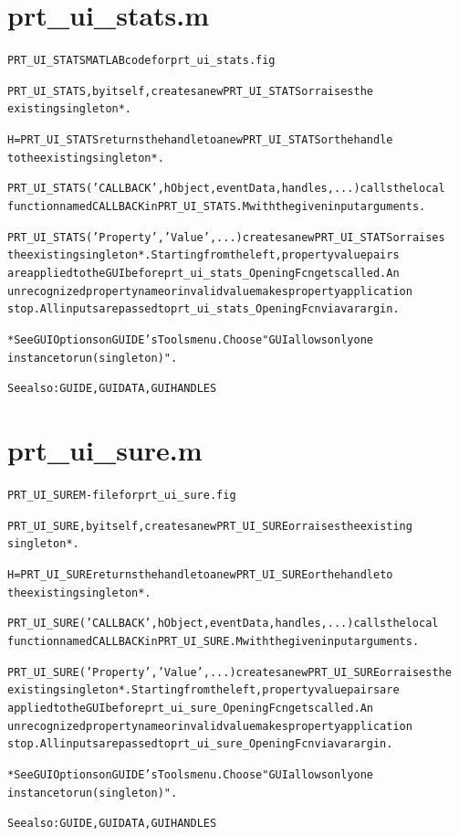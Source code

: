 \section{prt\_ui\_stats.m}
\begin{alltt}

 PRT\_UI\_STATS MATLAB code for prt\_ui\_stats.fig
 
 PRT\_UI\_STATS, by itself, creates a new PRT\_UI\_STATS or raises the
 existing singleton*.
 
 H = PRT\_UI\_STATS returns the handle to a new PRT\_UI\_STATS or the handle
 to the existing singleton*.
 
 PRT\_UI\_STATS('CALLBACK',hObject,eventData,handles,...) calls the local
 function named CALLBACK in PRT\_UI\_STATS.M with the given input arguments.
 
 PRT\_UI\_STATS('Property','Value',...) creates a new PRT\_UI\_STATS or raises
 the existing singleton*.  Starting from the left, property value pairs
 are applied to the GUI before prt\_ui\_stats\_OpeningFcn gets called.  An
 unrecognized property name or invalid value makes property application
 stop.  All inputs are passed to prt\_ui\_stats\_OpeningFcn via varargin.
 
 *See GUI Options on GUIDE's Tools menu.  Choose "GUI allows only one
 instance to run (singleton)".
 
 See also: GUIDE, GUIDATA, GUIHANDLES
\end{alltt}


\section{prt\_ui\_sure.m}
\begin{alltt}

 PRT\_UI\_SURE M-file for prt\_ui\_sure.fig
 
 PRT\_UI\_SURE, by itself, creates a new PRT\_UI\_SURE or raises the existing
 singleton*.
 
 H = PRT\_UI\_SURE returns the handle to a new PRT\_UI\_SURE or the handle to
 the existing singleton*.
 
 PRT\_UI\_SURE('CALLBACK',hObject,eventData,handles,...) calls the local
 function named CALLBACK in PRT\_UI\_SURE.M with the given input arguments.
 
 PRT\_UI\_SURE('Property','Value',...) creates a new PRT\_UI\_SURE or raises the
 existing singleton*.  Starting from the left, property value pairs are
 applied to the GUI before prt\_ui\_sure\_OpeningFcn gets called.  An
 unrecognized property name or invalid value makes property application
 stop.  All inputs are passed to prt\_ui\_sure\_OpeningFcn via varargin.
 
 *See GUI Options on GUIDE's Tools menu.  Choose "GUI allows only one
 instance to run (singleton)".
 
 See also: GUIDE, GUIDATA, GUIHANDLES
\end{alltt}


